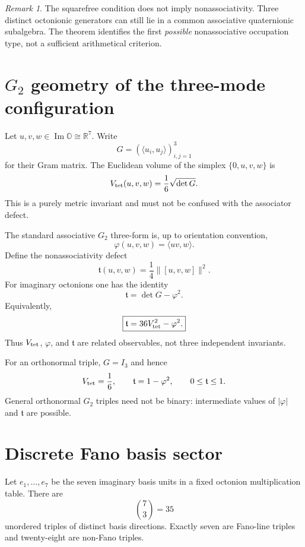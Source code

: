 \documentclass[11pt,a4paper]{article}
\theoremstyle{definition}
\theoremstyle{remark}
\newtheorem{remark}[theorem]{Remark}
\newcommand{\OO}{\mathbb O}
\newcommand{\RR}{\mathbb R}
\begin{document}
\begin{remark}
The squarefree condition does not imply nonassociativity. Three distinct octonionic generators can still lie in a common associative quaternionic subalgebra. The theorem identifies the first \emph{possible} nonassociative occupation type, not a sufficient arithmetical criterion.
\end{remark}

\section{$G_2$ geometry of the three-mode configuration}
Let $u,v,w\in\operatorname{Im}\OO\cong\RR^7$. Write
\[
G=(\langle u_i,u_j\rangle)_{i,j=1}^3
\]
for their Gram matrix. The Euclidean volume of the simplex $\{0,u,v,w\}$ is
\begin{equation}
V_{\rm tet}(u,v,w)=\frac16\sqrt{\det G}.
\end{equation}
This is a purely metric invariant and must not be confused with the associator defect.

The standard associative $G_2$ three-form is, up to orientation convention,
\begin{equation}
\varphi(u,v,w)=\langle uv,w\rangle.
\end{equation}
Define the nonassociativity defect
\begin{equation}
\mathfrak t(u,v,w)=\frac14\|[u,v,w]\|^2.
\end{equation}
For imaginary octonions one has the identity
\begin{equation}\label{eq:g2identity}
\boxed{\mathfrak t=\det G-\varphi^2.}
\end{equation}
Equivalently,
\begin{equation}
\boxed{\mathfrak t=36V_{\rm tet}^2-\varphi^2.}
\end{equation}
Thus $V_{\rm tet}$, $\varphi$, and $\mathfrak t$ are related observables, not three independent invariants.

For an orthonormal triple, $G=I_3$ and hence
\[
V_{\rm tet}=\frac16,
\qquad
\mathfrak t=1-\varphi^2,
\qquad
0\le\mathfrak t\le1.
\]
General orthonormal $G_2$ triples need not be binary: intermediate values of $|\varphi|$ and $\mathfrak t$ are possible.

\section{Discrete Fano basis sector}
Let $e_1,\dots,e_7$ be the seven imaginary basis units in a fixed octonion multiplication table. There are
\[
\binom73=35
\]
unordered triples of distinct basis directions. Exactly seven are Fano-line triples and twenty-eight are non-Fano triples.
\end{document}
